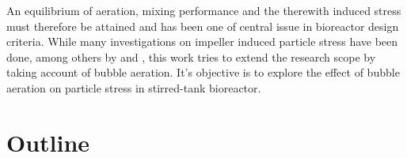 An equilibrium of aeration, mixing performance and the therewith induced stress must therefore be attained and has been one of central issue in bioreactor design criteria. While many investigations on impeller induced particle stress have been done, among others by \citet{Wollny2010Diss} and \citet{Malik2018Master}, this work tries to extend the research scope by taking account of bubble aeration. It's objective is to explore the effect of bubble aeration on particle stress in stirred-tank bioreactor.


\section{Outline}
